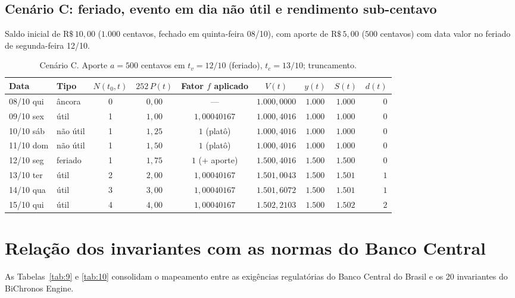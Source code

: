 \documentclass[11pt, a4paper]{article}
\theoremstyle{definition}
\theoremstyle{plain}
\theoremstyle{remark}
\begin{document}
\subsection{Cenário C: feriado, evento em dia não útil e rendimento sub-centavo}\label{sec:7.3}

Saldo inicial de $\text{R\$}\,10{,}00$ ($1.000$ centavos, fechado em quinta-feira 08/10), com aporte de $\text{R\$}\,5{,}00$ ($500$ centavos) com data valor no feriado de segunda-feira 12/10.

\begin{table}[htbp]
\centering
\small
\begin{tabular}{@{}llccccccr@{}}
\toprule
\textbf{Data} & \textbf{Tipo} & $N(t_0, t)$ & $252\,P(t)$ & \textbf{Fator $f$ aplicado} & $V(t)$ & $y(t)$ & $S(t)$ & $d(t)$ \\
\midrule
08/10 qui & âncora   & 0 & $0{,}00$ & ---            & $1.000{,}0000$ & $1.000$ & $1.000$ & $0$ \\
09/10 sex & útil     & 1 & $1{,}00$ & $1{,}00040167$ & $1.000{,}4016$ & $1.000$ & $1.000$ & $0$ \\
10/10 sáb & não útil & 1 & $1{,}25$ & $1$ (platô)    & $1.000{,}4016$ & $1.000$ & $1.000$ & $0$ \\
11/10 dom & não útil & 1 & $1{,}50$ & $1$ (platô)    & $1.000{,}4016$ & $1.000$ & $1.000$ & $0$ \\
12/10 seg & feriado  & 1 & $1{,}75$ & $1$ (+ aporte) & $1.500{,}4016$ & $1.500$ & $1.500$ & $0$ \\
13/10 ter & útil     & 2 & $2{,}00$ & $1{,}00040167$ & $1.501{,}0043$ & $1.500$ & $1.501$ & $1$ \\
14/10 qua & útil     & 3 & $3{,}00$ & $1{,}00040167$ & $1.501{,}6072$ & $1.500$ & $1.501$ & $1$ \\
15/10 qui & útil     & 4 & $4{,}00$ & $1{,}00040167$ & $1.502{,}2103$ & $1.500$ & $1.502$ & $2$ \\
\bottomrule
\end{tabular}
\caption{Cenário C. Aporte $a = 500$ centavos em $t_v = 12/10$ (feriado), $t_c = 13/10$; truncamento.}
\label{tab:8}
\end{table}

\section{Relação dos invariantes com as normas do Banco Central}\label{sec:8}

As Tabelas~\ref{tab:9} e \ref{tab:10} consolidam o mapeamento entre as exigências regulatórias do Banco Central do Brasil e os 20 invariantes do BiChronos Engine.
\end{document}
